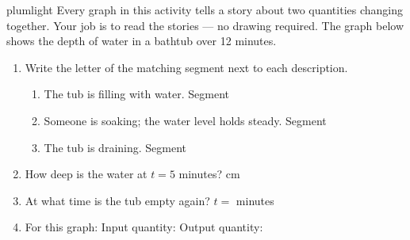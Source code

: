 \documentclass[10pt]{article}
\begin{document}

\vspace{0.12in}

\begin{scenariobox}{plumlight}
\small
Every graph in this activity tells a story about two quantities changing together.
Your job is to read the stories --- no drawing required. The graph below shows the
depth of water in a bathtub over 12 minutes.

\begin{center}
\end{center}
\end{scenariobox}

\vspace{0.1in}

\boxguard
\begin{tcolorbox}[colback=white, colframe=black!40,
    title=\textbf{Tier R --- Remediate},
    fonttitle=\bfseries, arc=2mm, left=3mm, right=3mm, top=2mm, bottom=2mm]

\begin{enumerate}[itemsep=8pt]
  \item Write the letter of the matching segment next to each description.

        \begin{enumerate}[label=(\alph*), itemsep=4pt]
          \item The tub is filling with water. \quad Segment \blank{1.5cm}
          \item Someone is soaking; the water level holds steady. \quad Segment \blank{1.5cm}
          \item The tub is draining. \quad Segment \blank{1.5cm}
        \end{enumerate}

  \item How deep is the water at $t = 5$ minutes? \quad \blank{2.5cm} cm

  \item At what time is the tub empty again? \quad $t = $ \blank{2.5cm} minutes

  \item For this graph: \quad Input quantity: \blank{2.6cm} \quad
        Output quantity: \blank{3cm}
\end{enumerate}
\end{tcolorbox}
\end{document}
